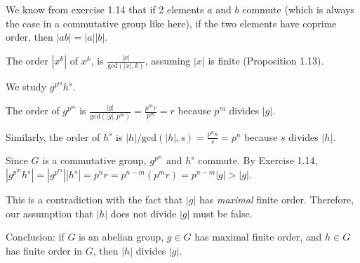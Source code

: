 We know from exercise 1.14 that if 2 elements $a$ and $b$ commute (which is always the case in a commutative group like here), if the two elements have coprime order, then $|ab| = |a||b|$.

The order $|x^k|$ of $x^k$, is $\frac{|x|}{\text{gcd}(|x|, k)}$, assuming $|x|$ is finite (Proposition 1.13).

We study $g^{p^m} h^s$. 

The order of $g^{p^m}$ is $\frac{|g|}{\text{gcd}(|g|, p^m)} = \frac{p^m r}{p^m} = r$ because $p^m$ divides $|g|$.

Similarly, the order of $h^s$ is $|h|/\text{gcd}(|h|, s) = \frac{p^n s}{s} = p^n$ because $s$ divides $|h|$.

Since $G$ is a commutative group, $g^{p^m}$ and $h^s$ commute. By Exercise 1.14, $|g^{p^m} h^s| = |g^{p^m}| |h^s| = p^n r = p^{n-m} (p^m r) = p^{n-m} |g| > |g|$.

This is a contradiction with the fact that $|g|$ has \textit{maximal} finite order. Therefore, our assumption that $|h|$ does not divide $|g|$ must be false.

Conclusion: if $G$ is an abelian group, $g \in G$ has maximal finite order, and $h \in G$ has finite order in $G$, then $|h|$ divides $|g|$.
